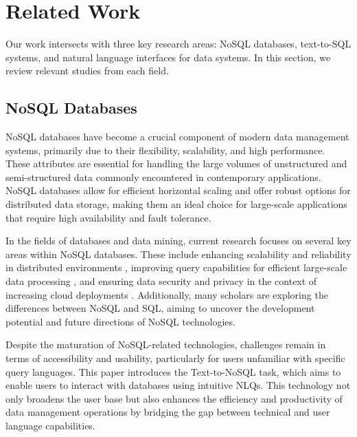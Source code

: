 \section{Related Work}
\label{sec:related_work}

Our work intersects with three key research areas: NoSQL databases, text-to-SQL systems, and natural language interfaces for data systems. In this section, we review relevant studies from each field.

\subsection{NoSQL Databases}
NoSQL databases have become a crucial component of modern data management systems, primarily due to their flexibility, scalability, and high performance. These attributes are essential for handling the large volumes of unstructured and semi-structured data commonly encountered in contemporary applications. NoSQL databases allow for efficient horizontal scaling and offer robust options for distributed data storage, making them an ideal choice for large-scale applications that require high availability and fault tolerance.

In the fields of databases and data mining, current research focuses on several key areas within NoSQL databases. These include enhancing scalability and reliability in distributed environments \cite{10.1145/1978915.1978919}, improving query capabilities for efficient large-scale data processing \cite{MAHAJAN2019120}, and ensuring data security and privacy in the context of increasing cloud deployments \cite{10.1109/TrustCom.2011.70}. Additionally, many scholars are exploring the differences between NoSQL and SQL, aiming to uncover the development potential and future directions of NoSQL technologies.

Despite the maturation of NoSQL-related technologies, challenges remain in terms of accessibility and usability, particularly for users unfamiliar with specific query languages. This paper introduces the Text-to-NoSQL task, which aims to enable users to interact with databases using intuitive NLQs. This technology not only broadens the user base but also enhances the efficiency and productivity of data management operations by bridging the gap between technical and user language capabilities.

\vspace{-5pt}
